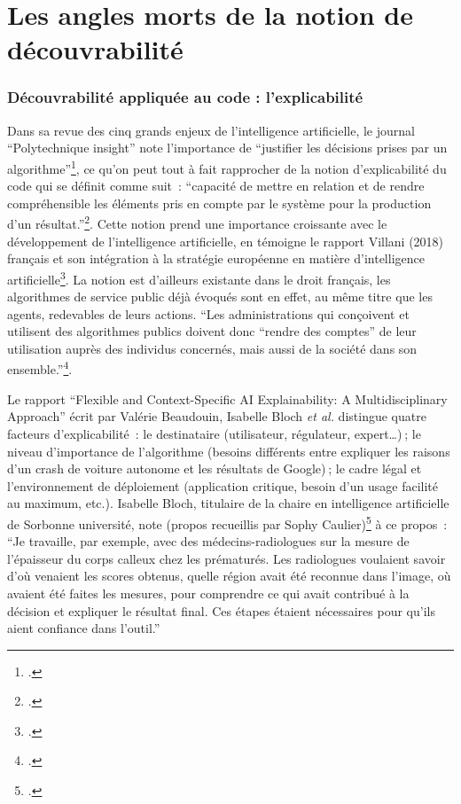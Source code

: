 \chapter{Les angles morts de la notion de découvrabilité}

\subsection{Découvrabilité appliquée au code : l'explicabilité}

Dans sa revue des cinq grands enjeux de l’intelligence artificielle, le journal \enquote{Polytechnique insight} note l’importance de \enquote{justifier les décisions prises par un algorithme}\footcite{noauthor_nouveaux_nodate}, ce qu’on peut tout à fait rapprocher de la notion d’explicabilité du code qui se définit comme suit : \enquote{capacité de mettre en relation et de rendre compréhensible les éléments pris en compte par le système pour la production d’un résultat.}\footcite{zotero-315}. Cette notion prend une importance croissante avec le développement de l’intelligence artificielle, en témoigne le rapport Villani (2018) français et son intégration à la stratégie européenne en matière d’intelligence artificielle\footcite[p. 14]{maxwell_comment_2020}. La notion est d’ailleurs existante dans le droit français, les algorithmes de service public déjà évoqués sont en effet, au même titre que les agents, redevables de leurs actions. \enquote{Les administrations qui conçoivent et utilisent des algorithmes publics doivent donc “rendre des comptes” de leur utilisation auprès des individus concernés, mais aussi de la société dans son ensemble.}\footcite{noauthor_algorithmes_nodate-1}. 

Le rapport \enquote{Flexible and Context-Specific AI Explainability: A Multidisciplinary Approach} écrit par Valérie Beaudouin, Isabelle Bloch \textit{et al.} distingue quatre facteurs d’explicabilité : le destinataire (utilisateur, régulateur, expert…) ; le niveau d’importance de l’algorithme (besoins différents entre expliquer les raisons d’un crash de voiture autonome et les résultats de Google) ; le cadre légal et l’environnement de déploiement (application critique, besoin d’un usage facilité au maximum, etc.). Isabelle Bloch, titulaire de la chaire en intelligence artificielle de Sorbonne université, note (propos recueillis par Sophy Caulier)\footcite{noauthor_nouveaux_nodate} à ce propos : \enquote{Je travaille, par exemple, avec des médecins-radiologues sur la mesure de l’épaisseur du corps calleux chez les prématurés. Les radiologues voulaient savoir d’où venaient les scores obtenus, quelle région avait été reconnue dans l’image, où avaient été faites les mesures, pour comprendre ce qui avait contribué à la décision et expliquer le résultat final. Ces étapes étaient nécessaires pour qu’ils aient confiance dans l’outil.}

